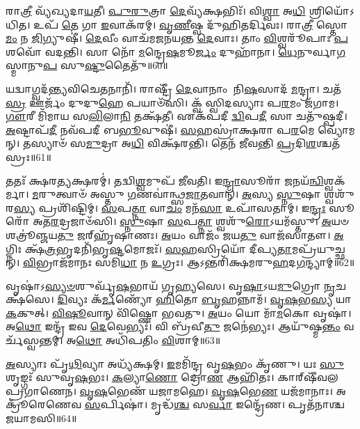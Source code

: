𑌰𑌾\-\ul{𑌤𑍍𑌰𑍀} 𑌵𑍍𑌯᳴𑌖𑍍𑌯𑌦𑌾\-\ul{𑌯}\-𑌤𑍀।
\-\ul{𑌪𑍁}\-\-\ul{𑌰𑍁}\-𑌤𑍍𑌰𑌾 \ul{𑌦𑍇}\-𑌵𑍍𑌯᳴𑌕𑍍𑌷𑌭𑌿𑌃᳴।
𑌵𑌿\-\ul{𑌶𑍍𑌵𑌾} 𑌅\-\ul{𑌧𑌿} 𑌶𑍍𑌰𑌿𑌯𑍋᳴𑌽𑌧𑌿𑌤।
𑌉𑌪᳴ \ul{𑌤𑍇} 𑌗𑌾 \ul{𑌇}\-𑌵𑌾𑌕᳴𑌰𑌮𑍍।
\-\ul{𑌵𑍃}\-\-\ul{𑌣𑍀}\-𑌷𑍍𑌵 𑌦𑍁᳴𑌹𑌿𑌤𑌰𑍍𑌦𑌿𑌵𑌃।
𑌰𑌾\-\ul{𑌤𑍍𑌰𑍀} 𑌸𑍍𑌤𑍋\-\ul{𑌮𑌂} 𑌨 \ul{𑌜𑌿}\-𑌗𑍍𑌯𑍁𑌷𑍀॑।
\-\ul{𑌦𑍇}\-𑌵𑍀𑌂 𑌵𑌾𑌚᳴𑌮𑌜𑌨𑌯𑌨𑍍𑌤 \ul{𑌦𑍇}\-𑌵𑌾𑌃।
𑌤𑌾𑌂 \ul{𑌵𑌿}\-𑌶𑍍𑌵𑌰𑍂᳴𑌪𑌾𑌃 \ul{𑌪}\-𑌶𑌵𑍋᳴ 𑌵𑌦𑌨𑍍𑌤𑌿।
𑌸𑌾 𑌨𑍋᳴ \ul{𑌮}\-𑌨𑍍𑌦𑍍𑌰𑍇\-\ul{𑌷}\-𑌮𑍂\-\ul{𑌰𑍍𑌜𑌂} 𑌦𑍁𑌹𑌾᳴𑌨𑌾।
\-\ul{𑌧𑍇}\-𑌨𑍁𑌰𑍍𑌵𑌾\-\ul{𑌗}\-𑌸𑍍𑌮𑌾𑌨𑍁\-\ul{𑌪} 𑌸𑍁\-\ul{𑌷𑍍𑌟𑍁}\-𑌤𑍈𑌤𑍁᳴॥60॥

𑌯𑌦𑍍𑌵𑌾𑌗𑍍𑌵𑌦᳴𑌨𑍍𑌤𑍍𑌯𑌵𑌿𑌚𑍇\-\ul{𑌤}\-𑌨𑌾𑌨𑌿᳴।
𑌰𑌾𑌷𑍍𑌟𑍍𑌰𑍀᳴ \ul{𑌦𑍇}\-𑌵𑌾𑌨𑌾𑌂 𑌨𑌿\-\ul{𑌷}\-𑌸𑌾𑌦᳴ \ul{𑌮}\-𑌨𑍍𑌦𑍍𑌰𑌾।
𑌚𑌤᳴\-\ul{𑌸𑍍𑌰} 𑌊𑌰𑍍𑌜𑌂᳴ 𑌦𑍁𑌦𑍁\-\ul{𑌹𑍇} 𑌪𑌯𑌾𑍞᳴𑌸𑌿।
𑌕𑍍𑌵᳴ 𑌸𑍍𑌵𑌿𑌦𑌸𑍍𑌯𑌾𑌃 𑌪\-\ul{𑌰}\-𑌮𑌂 𑌜᳴𑌗𑌾𑌮।
\-\ul{𑌗𑍗}\-𑌰𑍀 𑌮𑌿᳴𑌮𑌾𑌯 𑌸\-\ul{𑌲𑌿}\-𑌲𑌾\-\ul{𑌨𑌿} 𑌤𑌕𑍍𑌷᳴𑌤𑍀।
𑌏𑌕᳴𑌪𑌦𑍀 \ul{𑌦𑍍𑌵𑌿}\-𑌪\-\ul{𑌦𑍀} 𑌸𑌾 𑌚𑌤𑍁᳴𑌷𑍍𑌪𑌦𑍀।
\-\ul{𑌅}\-𑌷𑍍𑌟𑌾𑌪᳴\-\ul{𑌦𑍀} 𑌨𑌵᳴𑌪𑌦𑍀 𑌬\-\ul{𑌭𑍂}\-𑌵𑍁𑌷𑍀॑।
\-\ul{𑌸}\-𑌹𑌸𑍍𑌰𑌾॑𑌕𑍍𑌷𑌰𑌾 𑌪\-\ul{𑌰}\-𑌮𑍇 𑌵𑍍𑌯𑍋᳴𑌮𑌨𑍍।
𑌤𑌸𑍍𑌯𑌾𑍞᳴ 𑌸\-\ul{𑌮𑍁}\-𑌦𑍍𑌰𑌾 𑌅\-\ul{𑌧𑌿} 𑌵𑌿𑌕𑍍𑌷᳴𑌰𑌨𑍍𑌤𑌿।
𑌤𑍇𑌨᳴ 𑌜𑍀𑌵𑌨𑍍𑌤𑌿 \ul{𑌪𑍍𑌰}\-𑌦𑌿\-\ul{𑌶}\-𑌶𑍍𑌚𑌤᳴𑌸𑍍𑌰𑌃॥61॥

𑌤𑌤𑌃᳴ 𑌕𑍍𑌷𑌰\-\ul{𑌤𑍍𑌯}\-𑌕𑍍𑌷𑌰𑌮𑍍॑।
𑌤𑌦𑍍𑌵𑌿\-\ul{𑌶𑍍𑌵}\-𑌮𑍁𑌪᳴ 𑌜𑍀𑌵𑌤𑌿।
𑌇\-\ul{𑌨𑍍𑌦𑍍𑌰𑌾}\-𑌸𑍂𑌰𑌾᳴ \ul{𑌜}\-𑌨𑌯᳴\-\ul{𑌨𑍍𑌵𑌿}\-𑌶𑍍𑌵𑌕᳴𑌰𑍍𑌮𑌾।
\-\ul{𑌮}\-𑌰𑍁𑌤𑍍𑌵𑌾𑍞᳴ 𑌅𑌸𑍍𑌤𑍁 \ul{𑌗}\-𑌣𑌵𑌾॑𑌨𑍍𑌥𑍍𑌸\-\ul{𑌜𑌾}\-𑌤𑌵𑌾𑌨𑍍᳴।
\-\ul{𑌅}\-𑌸𑍍𑌯 \ul{𑌸𑍍𑌨𑍁}\-𑌷𑌾 𑌶𑍍𑌵𑌶𑍁᳴𑌰\-\ul{𑌸𑍍𑌯} 𑌪𑍍𑌰𑌶𑌿᳴𑌷𑍍𑌟𑌿𑌮𑍍।
\-\ul{𑌸}\-𑌪\-\ul{𑌤𑍍𑌨𑌾} 𑌵𑌾\-\ul{𑌚𑌂} 𑌮𑌨᳴\-\ul{𑌸𑌾} 𑌉𑌪𑌾᳴𑌸𑌤𑌾𑌮𑍍।
𑌇\-\ul{𑌨𑍍𑌦𑍍𑌰𑌃} 𑌸𑍂𑌰𑍋᳴ 𑌅𑌤\-\ul{𑌰}\-𑌦𑍍𑌰𑌜𑌾𑍞᳴𑌸𑌿।
\-\ul{𑌸𑍍𑌨𑍁}\-𑌷𑌾 \ul{𑌸}\-𑌪\-\ul{𑌤𑍍𑌨𑌾} 𑌶𑍍𑌵𑌶𑍁᳴\-\ul{𑌰𑍋}\-\-𑌽𑌯𑌮᳴𑌸𑍍𑌤𑍁।
\-\ul{𑌅}\-𑌯𑍞 𑌶𑌤𑍍𑌰𑍂॑𑌞𑍍𑌜𑌯\-\ul{𑌤𑍁} 𑌜𑌰𑍍‌\mbox{}𑌹𑍃᳴𑌷𑌾𑌣𑌃।
\-\ul{𑌅}\-𑌯𑌂 𑌵𑌾𑌜𑌂᳴ 𑌜𑌯\-\ul{𑌤𑍁} 𑌵𑌾𑌜᳴𑌸𑌾𑌤𑍗।
\-\ul{𑌅}\-𑌗𑍍𑌨𑌿𑌃 𑌕𑍍𑌷᳴\-\ul{𑌤𑍍𑌰}\-𑌭𑍃𑌦𑌨𑌿᳴𑌭𑍃\-\ul{𑌷𑍍𑌟}\-𑌮𑍋𑌜𑌃᳴।
\-\ul{𑌸}\-\-\ul{𑌹}\-𑌸𑍍𑌰𑌿𑌯𑍋᳴ 𑌦𑍀𑌪𑍍𑌯\-\ul{𑌤𑌾}\-𑌮𑌪𑍍𑌰᳴𑌯𑍁𑌚𑍍𑌛𑌨𑍍।
\-\ul{𑌵𑌿}\-𑌭𑍍𑌰𑌾𑌜᳴𑌮𑌾𑌨𑌃 𑌸𑌮𑌿\-\ul{𑌧𑌾} 𑌨 \ul{𑌉}\-𑌗𑍍𑌰𑌃।
𑌆𑌽𑌨𑍍𑌤𑌰𑌿᳴𑌕𑍍𑌷𑌮𑌰𑍁\-\ul{𑌹}\-𑌦\-\ul{𑌗}\-𑌨𑍍𑌦𑍍𑌯𑌾𑌮𑍍॥62॥\anuvakamend[\-\ul{𑌧𑌾}\-𑌰𑌯᳴𑌨𑍍𑌪𑍁\-\ul{𑌰𑍋}\-𑌡𑌾\-\ul{𑌶𑌂} 𑌬𑍃\-\ul{𑌹}\-𑌸𑍍𑌪𑌤𑌿𑌂᳴ \ul{𑌜}\-𑌘𑌨᳴𑌚𑍍𑌯𑍁𑌤𑌿𑌮𑌾\-\ul{𑌨}\-𑌨𑍍𑌦𑍋 𑌭𑌗᳴𑌸𑍍𑌯 𑌤𑍃𑌪𑍍𑌯𑌾\-\ul{𑌣𑍍𑌯}\-𑌗𑍍𑌨𑍇𑌃 𑌪𑍃᳴\-\ul{𑌥𑌿}\-𑌵𑍀 𑌯𑌜𑍍𑌵᳴𑌨 𑌏𑌤𑍁 \ul{𑌪𑍍𑌰}\-𑌦𑌿\-\ul{𑌶}\-𑌶𑍍𑌚𑌤᳴\-\ul{𑌸𑍍𑌰𑍋} 𑌵𑌾𑌜᳴𑌸𑌾𑌤𑍗 \ul{𑌚}\-𑌤𑍍𑌵𑌾𑌰𑌿᳴ 𑌚]

𑌵𑍃𑌷𑌾॑\-𑌽\-\ul{𑌸𑍍𑌯}\-\-\ul{𑍞}\-𑌶𑍁𑌰𑍍𑌵𑍃᳴\-\ul{𑌷}\-𑌭𑌾𑌯᳴ 𑌗𑍃𑌹𑍍𑌯𑌸𑍇।
𑌵𑍃\-\ul{𑌷𑌾}\-\-𑌽𑌯\-\ul{𑌮𑍁}\-𑌗𑍍𑌰𑍋 \ul{𑌨𑍃}\-𑌚𑌕𑍍𑌷᳴𑌸𑍇।
\-\ul{𑌦𑌿}\-𑌵𑍍𑌯𑌃 𑌕᳴\-\ul{𑌰𑍍𑌮}\-𑌣𑍍𑌯𑍋᳴ \ul{𑌹𑌿}\-𑌤𑍋 \ul{𑌬𑍃}\-𑌹𑌨𑍍𑌨𑌾𑌮᳴।
\-\ul{𑌵𑍃}\-\-\ul{𑌷}\-𑌭\-\ul{𑌸𑍍𑌯} 𑌯𑌾 \ul{𑌕}\-𑌕𑍁𑌤𑍍।
\-\ul{𑌵𑌿}\-\-\ul{𑌷𑍂}\-𑌵𑌾𑌨𑍍 𑌵𑌿᳴𑌷𑍍𑌣𑍋 𑌭𑌵𑌤𑍁।
\-\ul{𑌅}\-𑌯𑌂 𑌯𑍋 𑌮𑌾᳴\-\ul{𑌮}\-𑌕𑍋 𑌵𑍃𑌷𑌾॑।
𑌅\-\ul{𑌥𑍋} 𑌇𑌨𑍍𑌦𑍍𑌰᳴ 𑌇𑌵 \ul{𑌦𑍇}\-𑌵𑍇𑌭𑍍𑌯𑌃᳴।
𑌵𑌿 𑌬𑍍𑌰᳴𑌵𑍀\-\ul{𑌤𑍁} 𑌜𑌨𑍇॑𑌭𑍍𑌯𑌃।
𑌆𑌯𑍁᳴𑌷𑍍𑌮\-\ul{𑌨𑍍𑌤𑌂} 𑌵𑌰𑍍𑌚᳴𑌸𑍍𑌵𑌨𑍍𑌤𑌮𑍍।
𑌅\-\ul{𑌥𑍋} 𑌅𑌧𑌿᳴𑌪𑌤𑌿𑌂 \ul{𑌵𑌿}\-𑌶𑌾𑌮𑍍॥63॥

\-\ul{𑌅}\-𑌸𑍍𑌯𑌾𑌃 𑌪𑍃᳴\-\ul{𑌥𑌿}\-𑌵𑍍𑌯𑌾 𑌅𑌧𑍍𑌯᳴𑌕𑍍𑌷𑌮𑍍।
\-\ul{𑌇}\-𑌮𑌮𑌿᳴𑌨𑍍𑌦𑍍𑌰 𑌵𑍃\-\ul{𑌷}\-𑌭𑌂 𑌕𑍃᳴𑌣𑍁।
𑌯𑌃 \ul{𑌸𑍁}\-𑌶𑍃𑌙𑍍𑌗𑌃᳴ 𑌸𑍁𑌵𑍃\-\ul{𑌷}\-𑌭𑌃।
\-\ul{𑌕}\-𑌲𑍍𑌯𑌾\-\ul{𑌣𑍋} 𑌦𑍍𑌰𑍋\-\ul{𑌣} 𑌆𑌹𑌿᳴𑌤𑌃।
𑌕𑌾𑌰𑍍‌\mbox{}𑌷𑍀᳴𑌵𑌲 𑌪𑍍𑌰𑌗𑌾𑌣𑍇𑌨।
\-\ul{𑌵𑍃}\-\-\ul{𑌷}\-𑌭𑍇𑌣᳴ 𑌯𑌜𑌾𑌮𑌹𑍇।
\-\ul{𑌵𑍃}\-\-\ul{𑌷}\-𑌭𑍇\-\ul{𑌣} 𑌯𑌜᳴𑌮𑌾𑌨𑌾𑌃।
𑌅𑌕𑍍𑌰𑍂᳴𑌰𑍇𑌣𑍇𑌵 \ul{𑌸}\-𑌰𑍍𑌪𑌿𑌷𑌾॑।
𑌮𑍃𑌦𑍍𑌧᳴\-\ul{𑌶𑍍𑌚} 𑌸\-\ul{𑌰𑍍𑌵𑌾} 𑌇𑌨𑍍𑌦𑍍𑌰𑍇᳴𑌣।
𑌪𑍃𑌤᳴𑌨𑌾𑌶𑍍𑌚 𑌜𑌯𑌾𑌮𑌸𑌿॥64॥

